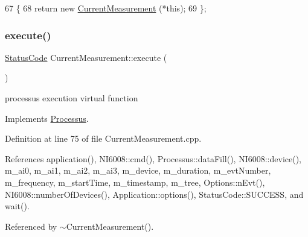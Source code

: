 \begin{DoxyCode}
67                              \{
68     \textcolor{keywordflow}{return} \textcolor{keyword}{new} \hyperlink{classCurrentMeasurement_ad89184bc1f2386b71051d7976ec662f1}{CurrentMeasurement} (*\textcolor{keyword}{this});
69   \};
\end{DoxyCode}
\mbox{\label{classCurrentMeasurement_a19ae0dcc63b4151ceebe0bf2c42da948}} 
\subsubsection{\texorpdfstring{execute()}{execute()}}
{\footnotesize\ttfamily \hyperlink{classStatusCode}{Status\+Code} Current\+Measurement\+::execute (\begin{DoxyParamCaption}{ }\end{DoxyParamCaption})\hspace{0.3cm}{\ttfamily [virtual]}}

processus execution virtual function 

Implements \hyperlink{classProcessus_a63767a63a1fb0055c5aa45b21a4a5d58}{Processus}.



Definition at line 75 of file Current\+Measurement.\+cpp.



References application(), N\+I6008\+::cmd(), Processus\+::data\+Fill(), N\+I6008\+::device(), m\+\_\+ai0, m\+\_\+ai1, m\+\_\+ai2, m\+\_\+ai3, m\+\_\+device, m\+\_\+duration, m\+\_\+evt\+Number, m\+\_\+frequency, m\+\_\+start\+Time, m\+\_\+timestamp, m\+\_\+tree, Options\+::n\+Evt(), N\+I6008\+::number\+Of\+Devices(), Application\+::options(), Status\+Code\+::\+S\+U\+C\+C\+E\+SS, and wait().



Referenced by $\sim$\+Current\+Measurement().


